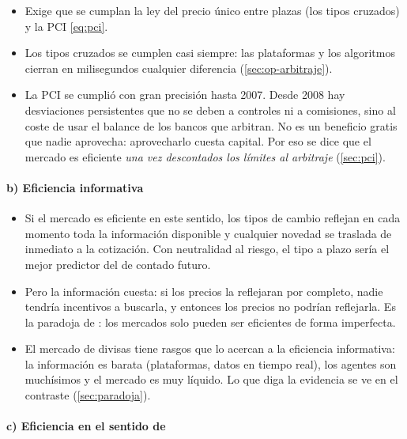 \documentclass[11pt]{article}
\begin{document}
\begin{itemize}
\item Exige que se cumplan la ley del precio único entre plazas (los tipos cruzados) y la PCI \eqref{eq:pci}.
\item Los tipos cruzados se cumplen casi siempre: las plataformas y los algoritmos cierran en milisegundos cualquier diferencia (\ref{sec:op-arbitraje}).
\item La PCI se cumplió con gran precisión hasta 2007. Desde 2008 hay desviaciones persistentes que no se deben a controles ni a comisiones, sino al coste de usar el balance de los bancos que arbitran\nocite{DuTepperVerdelhan2018Deviations}. No es un beneficio gratis que nadie aprovecha: aprovecharlo cuesta capital. Por eso se dice que el mercado es eficiente \emph{una vez descontados los límites al arbitraje} (\ref{sec:pci}).
\end{itemize}

\paragraph{b) Eficiencia informativa}

\begin{itemize}
\item Si el mercado es eficiente en este sentido, los tipos de cambio reflejan en cada momento toda la información disponible y cualquier novedad se traslada de inmediato a la cotización. Con neutralidad al riesgo, el tipo a plazo sería el mejor predictor del de contado futuro.
\item Pero la información cuesta: si los precios la reflejaran por completo, nadie tendría incentivos a buscarla, y entonces los precios no podrían reflejarla. Es la paradoja de \textcite{GrossmanStiglitz1980}: los mercados solo pueden ser eficientes de forma imperfecta.
\item El mercado de divisas tiene rasgos que lo acercan a la eficiencia informativa: la información es barata (plataformas, datos en tiempo real), los agentes son muchísimos y el mercado es muy líquido. Lo que diga la evidencia se ve en el contraste (\ref{sec:paradoja}).
\end{itemize}

\paragraph{c) Eficiencia en el sentido de }
\end{document}
